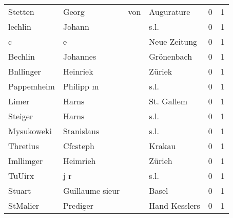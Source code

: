 \begin{center}
\begin{tiny}
\begin{longtabu}{llllrr}
                  Stetten &                              Georg &         von &                                  Augurature &          0 &         1 \\
                  lechlin &                             Johann &             &                                        s.l. &          0 &         1 \\
                        c &                                  e &             &                                Neue Zeitung &          0 &         1 \\
                  Bechlin &                           Johannes &             &                                  Grönenbach &          0 &         1 \\
                Bnllinger &                           Heinriek &             &                                      Züriek &          0 &         1 \\
               Pappemheim &                          Philipp m &             &                                        s.l. &          0 &         1 \\
                    Limer &                              Harns &             &                                  St. Gallem &          0 &         1 \\
                  Steiger &                              Harns &             &                                        s.l. &          0 &         1 \\
               Mysukoweki &                         Stanislaus &             &                                        s.l. &          0 &         1 \\
                 Thretius &                           Cfcsteph &             &                                      Krakau &          0 &         1 \\
                Imllimger &                           Heimrieh &             &                                      Zürieh &          0 &         1 \\
                   TuUirx &                                j r &             &                                        s.l. &          0 &         1 \\
                   Stuart &                    Guillaume sieur &             &                                       Basel &          0 &         1 \\
                 StMalier &                           Prediger &             &                               Hand Kesslers &          0 &         1 \\

\end{longtabu}
\end{tiny}
\end{center}

